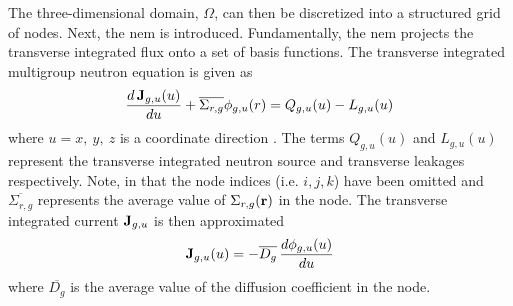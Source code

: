     The three-dimensional domain, $\Omega$, can then be discretized into a
    structured grid of nodes. Next, the \gls{nem} is introduced. Fundamentally,
    the \gls{nem} projects the transverse integrated flux onto a set of basis
    functions. The transverse integrated multigroup neutron equation is given as
    \begin{equation}
      \label{eq:transverse_multigroup_diffusion}
      \frac{d \, \mathbf{J}_{g,u} (u)}{d u} + \overline{\Sigma_{r,g}}
        \phi_{g,u}(r) = Q_{g,u}(u) - L_{g,u}(u)
    \end{equation}
    where $u = x,\ y,\ z$ is a coordinate direction \cite{qe2paper}. The terms 
    $Q_{g,u}(u)$ and $L_{g,u}(u)$ represent the transverse integrated neutron
    source and transverse leakages respectively. Note, in
     that the node indices (i.e.
    $i,j,k$) have been omitted and $\overline{\Sigma_{r,g}}$ represents the
    average value of $\Sigma_{r,g}(\mathbf{r})$ in the node. The transverse integrated
    current $\mathbf{J}_{g,u}$ is then approximated
    \begin{equation}
      \label{eq:current_approximation}
      \mathbf{J}_{g,u}(u) = - \overline{D_g} \, \frac{d \phi_{g,u}(u)}{du}
    \end{equation}
    where $\overline{D_g}$ is the average value of the diffusion coefficient in
    the node.

